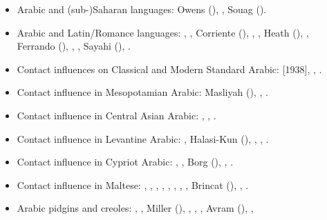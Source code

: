 \documentclass[output=paper]{langsci/langscibook}
\begin{document}
\begin{itemize}[noitemsep,leftmargin=11pt]
\item[\adfhalfrightarrowhead]Arabic and (sub-)Saharan languages: Owens (\citeyear{Owens2000article,Owens2015,Owens2016idioms}), \citet{OwensHassan2004}, Souag (\citeyear{Souag2013lexical,Souag2016sahara}).

\item[\adfhalfrightarrowhead]Arabic and Latin/Romance languages: \citet{Brunot1949}, \citet{Benoliel1977}, Corriente (\citeyear{Corriente1978,Corriente1992chapter,Corriente1992book,Corriente2000,Corriente2005,Corriente2008}), \citet{Talmoudi1986}, \citet{Abdu1988}, Heath (\citeyear{Heath1989,Heath1999,Heath2015}), \citet{Cifoletti1994}, Ferrando (\citeyear{Ferrando1995,Ferrando1997}), \citet{OuldMohamedBaba2003}, \citet{Vicente2006}, Sayahi
(\citeyear{Sayahi2011,Sayahi2014,Sayahi2015}), \citet{Danna2018phonetic}.

\item[\adfhalfrightarrowhead]Contact influences on Classical and Modern Standard Arabic: \citet{Jeffrey2007} [1938], \citet{Blau1969}, \citet{Hebbo1984}.

\item[\adfhalfrightarrowhead]Contact influence in Mesopotamian Arabic: Masliyah (\citeyear{Masliyah1996,Masliyah1997}), \citet{MatrasShabibi2007}, \citet{ElZarkaZiagos2019}.

\item[\adfhalfrightarrowhead]Contact influence in Central Asian Arabic: \citet{Jastrow2005}, \citet{Ratcliffe2005}, \citet{Ingham2011afg}.

\item[\adfhalfrightarrowhead]Contact influence in Levantine Arabic: \citet{Barbot1961}, Halasi-Kun (\citeyear{Halasi-Kun1969,Halasi-Kun1973,Halasi-Kun1982}), \citet{Hopkins1995}, \citet{Contini1999}, \citet{Neishtadt2015}.

\item[\adfhalfrightarrowhead]Contact influence in Cypriot Arabic: \citet{Newton1964}, \citet{Tsiapera1964}, Borg (\citeyear{Borg1985,Borg1997CMA,Borg2004}), \citet{Roth2004}, \citet{Gulle2016}.

\item[\adfhalfrightarrowhead]Contact influence in Maltese: \citet{colin1957}, \citet{Aquilina1958}, \citet{krier1976}, \citet{Drewes1994}, \citet{mifsudloanverbs}, \citet{stolz2003}, \citet{vella2003}, \citet{bovingdondalli2006}, Brincat (\citeyear{brincat1996,brincat2011}), \citet{comriespagnol2016},  \citet{Souag2018berber}.

\item[\adfhalfrightarrowhead]Arabic pidgins and creoles: \citet{Owens1985}, \citet{BurengVincent1986}, Miller (\citeyear{Miller1989,Miller1993}), \citet{Nakao2012}, \citet{Luffin2014}, \citet{Manfredi2014relex}, Avram (\citeyear{Avram2017article,Avram2019}), \citet{Bizri2018}, \citet{Owens2018}


\end{itemize}
\end{document}
